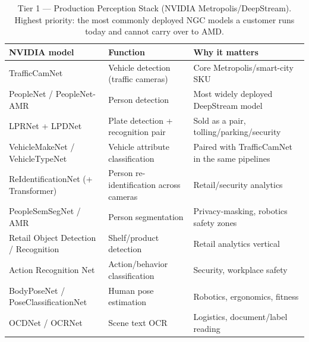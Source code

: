 \documentclass[blind]{gtac}
\begin{document}
\begin{table}[H]
\centering
\caption{Tier 1 --- Production Perception Stack (NVIDIA Metropolis/DeepStream). Highest priority: the most commonly deployed NGC models a customer runs today and cannot carry over to AMD.}
\label{tab:a1}
\tiny
\begin{tabular}{@{}p{0.85in}p{0.75in}p{0.75in}@{}}
\toprule
NVIDIA model & Function & Why it matters \\
\midrule
TrafficCamNet & Vehicle detection (traffic cameras) & Core Metropolis/smart-city SKU \\
PeopleNet / PeopleNet-AMR & Person detection & Most widely deployed DeepStream model \\
LPRNet + LPDNet & Plate detection + recognition pair & Sold as a pair, tolling/parking/security \\
VehicleMakeNet / VehicleTypeNet & Vehicle attribute classification & Paired with TrafficCamNet in the same pipelines \\
ReIdentificationNet (+ Transformer) & Person re-identification across cameras & Retail/security analytics \\
PeopleSemSegNet / AMR & Person segmentation & Privacy-masking, robotics safety zones \\
Retail Object Detection / Recognition & Shelf/product detection & Retail analytics vertical \\
Action Recognition Net & Action/behavior classification & Security, workplace safety \\
BodyPoseNet / PoseClassificationNet & Human pose estimation & Robotics, ergonomics, fitness \\
OCDNet / OCRNet & Scene text OCR & Logistics, document/label reading \\
\bottomrule
\end{tabular}
\end{table}
\end{document}
